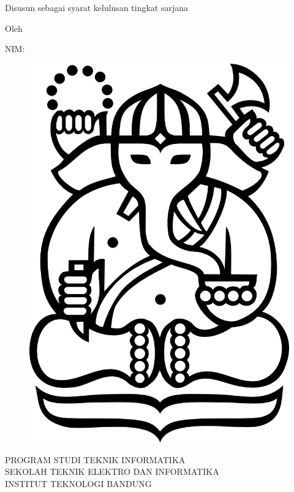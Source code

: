 \clearpage
\pagestyle{empty}

\begin{center}
\smallskip

    \Large \bfseries
    \judul
    \vfill

    \Large \context
    \vfill

    \large Disusun sebagai syarat kelulusan tingkat sarjana\\
    \large \matakuliah
    \vfill

    \large Oleh

    \Large \penulis

    \Large NIM: \nimpenulis

    \vfill
    \begin{figure}[h]
        \centering
        \includegraphics[scale=0.15]{resources/cover-ganesha}
    \end{figure}
    \vfill

    \large
    \uppercase{
        Program Studi Teknik Informatika \\
        Sekolah Teknik Elektro dan Informatika \\
        Institut Teknologi Bandung
    }

    \bulan\ \tahun

\end{center}

\clearpage
